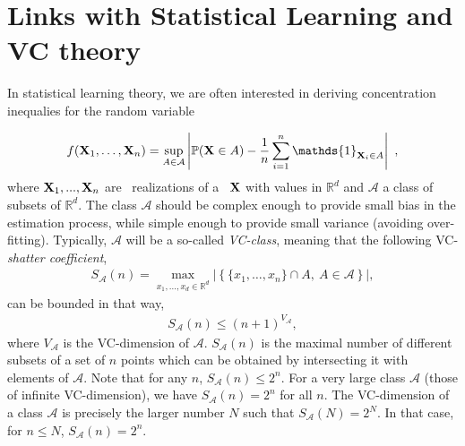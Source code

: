 \section{Links with Statistical Learning and VC theory}
In statistical learning theory, we are often interested in deriving concentration inequalies for the random variable 

\begin{align}
\label{def_F}
f(\mb X_1,\ldots,\mb X_n)= \sup_{A \in \mathcal{A}} \left | \mathbb{P}(\mb X \in A) - \frac{1}{n} \sum_{i=1}^n \mathds{1}_{\mb X_i \in A} \right|~,
\end{align}
where $\mathbf X_1,...,\mathbf X_n$ are \iid~realizations of a \rv~$\mathbf X$ with values in $\mathbb{R}^d$ and $\mathcal{A}$ a class of subsets of $\mathbb{R}^d$.
The class $\mathcal{A}$ should be complex enough to provide small bias in the estimation process, while simple enough to provide small variance (avoiding over-fitting). Typically, $\mathcal{A}$ will be a so-called \emph{VC-class}, meaning that the following VC-\emph{shatter coefficient},
\begin{align}
S_{\mathcal{A}}(n) = \max_{ x_1,\ldots,x_d \in \mathbb{R}^d}  \left| \left\{ \{x_1,\ldots, x_n\} \cap A,~A\in \mathcal{A} \right\} \right|,
\end{align}
can be bounded in that way,
\begin{align}
S_{\mathcal{A}}(n) \le (n+1)^{V_\mathcal{A}},
\end{align}
where $V_\mathcal{A}$ is the VC-dimension of $\mathcal{A}$. 
$S_{\mathcal{A}}(n)$ is the maximal number of different subsets of a set of $n$ points which can be obtained by intersecting it with elements of $\mathcal{A}$. Note that for any $n$, $S_{\mathcal{A}}(n) \le 2^n$. For a very large class $\mathcal{A}$ (those of infinite VC-dimension), we have $S_{\mathcal{A}}(n) = 2^n$ for all $n$. The VC-dimension of a class $\mathcal{A}$ is precisely the larger number $N$ such that $S_{\mathcal{A}}(N) = 2^N$. In that case, for $n \le N$, $S_{\mathcal{A}}(n) = 2^n$.

